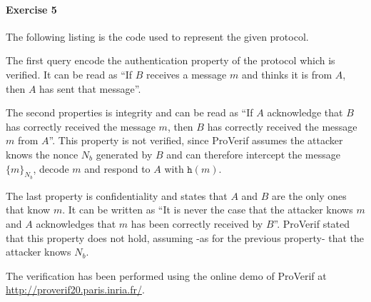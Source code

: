 \documentclass{article}
\begin{document}
\paragraph{Exercise 5}

The following listing is the code used to represent the given protocol.

The first query encode the authentication property of the protocol which is verified.
It can be read as ``If $B$ receives a message $m$ and thinks it is from $A$, then $A$ has sent that message''.

The second properties is integrity and can be read as ``If $A$ acknowledge that $B$ has correctly received the message $m$, then $B$ has correctly received the message $m$ from $A$''.
This property is not verified, since ProVerif assumes the attacker knows the nonce $N_b$ generated by $B$ and can therefore intercept the message $\{m\}_{N_b}$, decode $m$ and respond to $A$ with $\texttt{h}(m)$.

The last property is confidentiality and states that $A$ and $B$ are the only ones that know $m$.
It can be written as ``It is never the case that the attacker knows $m$ and $A$ acknowledges that $m$ has been correctly received by $B$''.
ProVerif stated that this property does not hold, assuming -as for the previous property- that the attacker knows $N_b$.

The verification has been performed using the online demo of ProVerif at \url{http://proverif20.paris.inria.fr/}.


\end{document}
